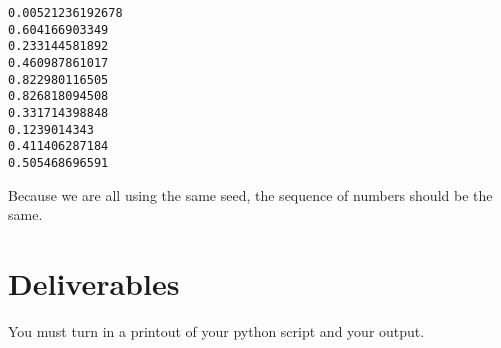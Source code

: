 \begin{fullwidth}

\begin{verbatim}
0.00521236192678
0.604166903349
0.233144581892
0.460987861017
0.822980116505
0.826818094508
0.331714398848
0.1239014343
0.411406287184
0.505468696591
\end{verbatim}

Because we are all using the same seed, the sequence of numbers should be the same.

\section{Deliverables}

You must turn in a printout of your python script and your output.

\end{fullwidth}
